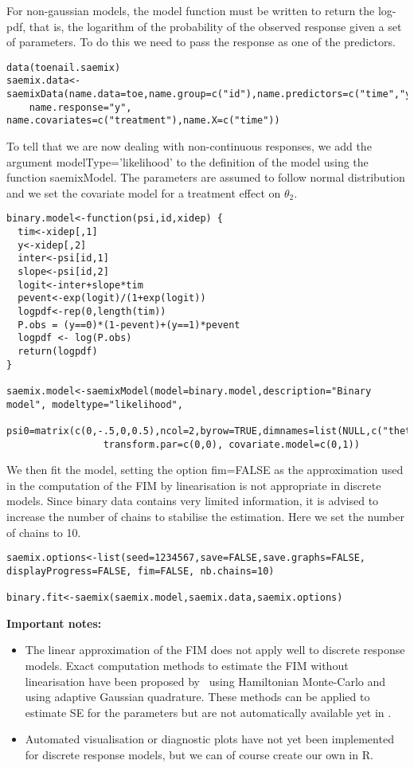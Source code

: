 {For non-gaussian models, the model function must be written to return the log-pdf, that is, the logarithm of the probability of the observed response given a set of parameters. To do this we need to pass the response as one of the predictors.
\begin{verbatim}
data(toenail.saemix)
saemix.data<-saemixData(name.data=toe,name.group=c("id"),name.predictors=c("time","y"), 
    name.response="y", name.covariates=c("treatment"),name.X=c("time"))
\end{verbatim}

To tell \monolix that we are now dealing with non-continuous responses, we add the argument {\sf modelType='likelihood'} to the definition of the model using the function {\sf saemixModel}. The parameters are assumed to follow normal distribution and we set the covariate model for a treatment effect on $\theta_2$.

\begin{verbatim}
binary.model<-function(psi,id,xidep) {
  tim<-xidep[,1]
  y<-xidep[,2]
  inter<-psi[id,1]
  slope<-psi[id,2]
  logit<-inter+slope*tim
  pevent<-exp(logit)/(1+exp(logit))
  logpdf<-rep(0,length(tim))
  P.obs = (y==0)*(1-pevent)+(y==1)*pevent
  logpdf <- log(P.obs)
  return(logpdf)
}

saemix.model<-saemixModel(model=binary.model,description="Binary model", modeltype="likelihood",
                 psi0=matrix(c(0,-.5,0,0.5),ncol=2,byrow=TRUE,dimnames=list(NULL,c("theta1","theta2"))),
                 transform.par=c(0,0), covariate.model=c(0,1))
\end{verbatim}

We then fit the model, setting the option {\sf fim=FALSE} as the approximation used in the computation of the FIM by linearisation is not appropriate in discrete models. Since binary data contains very limited information, it is advised to increase the number of chains to stabilise the estimation. Here we set the number of chains to 10.
\begin{verbatim}
saemix.options<-list(seed=1234567,save=FALSE,save.graphs=FALSE, displayProgress=FALSE, fim=FALSE, nb.chains=10)

binary.fit<-saemix(saemix.model,saemix.data,saemix.options)
\end{verbatim}

{\bf Important notes:}
\begin{itemize}
\item The linear approximation of the FIM does not apply well to discrete response models. Exact computation methods to estimate the FIM without linearisation have been proposed by~\cite{Riviere16} using Hamiltonian Monte-Carlo and~\cite{Ueckert16} using adaptive Gaussian quadrature. These methods can be applied to estimate SE for the parameters but are not automatically available yet in \monolix.
\item Automated visualisation or diagnostic plots have not yet been implemented for discrete response models, but we can of course create our own in R.
\end{itemize}

}
